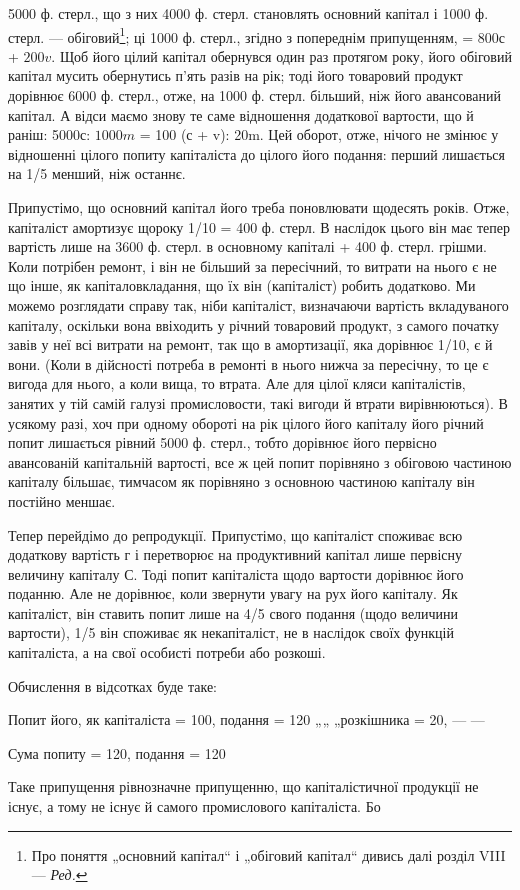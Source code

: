 \parcont{}  %
5000 ф. стерл., що з них 4000 ф. стерл. становлять основний капітал і
1000 ф. стерл. — обіговий\footnote*{
Про поняття „основний капітал“ і „обіговий капітал“ дивись далі розділ
VIII — \emph{Ред.}
}; ці 1000 ф. стерл., згідно з попереднім
припущенням, = 800с + $200v$. Щоб його цілий капітал обернувся
один раз протягом року, його обіговий капітал мусить обернутись п’ять
разів на рік; тоді його товаровий продукт дорівнює 6000 ф. стерл.,
отже, на 1000 ф. стерл. більший, ніж його авансований капітал. А відси
маємо знову те саме відношення додаткової вартости, що й раніш:
5000с: $1000m$ = 100 (с + v): 20m. Цей оборот, отже, нічого не
змінює у відношенні цілого попиту капіталіста до цілого його подання:
перший лишається на 1/5 менший, ніж останнє.

Припустімо, що основний капітал його треба поновлювати щодесять
років. Отже, капіталіст амортизує щороку 1/10 = 400 ф. стерл. В наслідок
цього він має тепер вартість лише на 3600 ф. стерл. в основному капіталі
+ 400 ф. стерл. грішми. Коли потрібен ремонт, і він не більший за
пересічний, то витрати на нього є не що інше, як капіталовкладання, що
їх він (капіталіст) робить додатково. Ми можемо розглядати справу так,
ніби капіталіст, визначаючи вартість вкладуваного капіталу, оскільки
вона ввіходить у річний товаровий продукт, з самого початку завів у
неї всі витрати на ремонт, так що в амортизації, яка дорівнює 1/10,
є й вони. (Коли в дійсності потреба в ремонті в нього нижча
за пересічну, то це є вигода для нього, а коли вища, то втрата. Але
для цілої кляси капіталістів, занятих у тій самій галузі промисловости,
такі вигоди й втрати вирівнюються). В усякому разі, хоч при одному
обороті на рік цілого його капіталу його річний попит лишається рівний
5000 ф. стерл., тобто дорівнює його первісно авансованій капітальній
вартості, все ж цей попит порівняно з обіговою частиною капіталу
більшає, тимчасом як порівняно з основною частиною капіталу він постійно
меншає.

Тепер перейдімо до репродукції. Припустімо, що капіталіст споживає
всю додаткову вартість г і перетворює на продуктивний капітал лише
первісну величину капіталу С. Тоді попит капіталіста щодо вартости
дорівнює його поданню. Але не дорівнює, коли звернути увагу на рух
його капіталу. Як капіталіст, він ставить попит лише на 4/5 свого подання
(щодо величини вартости), 1/5 він споживає як некапіталіст, не
в наслідок своїх функцій капіталіста, а на свої особисті потреби або
розкоші.

Обчислення в відсотках буде таке:

Попит його, як капіталіста = 100, подання = 120
    „„       „розкішника = 20, — —

            Сума попиту = 120, подання = 120

Таке припущення рівнозначне припущенню, що капіталістичної продукції
не існує, а тому не існує й самого промислового капіталіста. Бо
\parbreak{}  %
